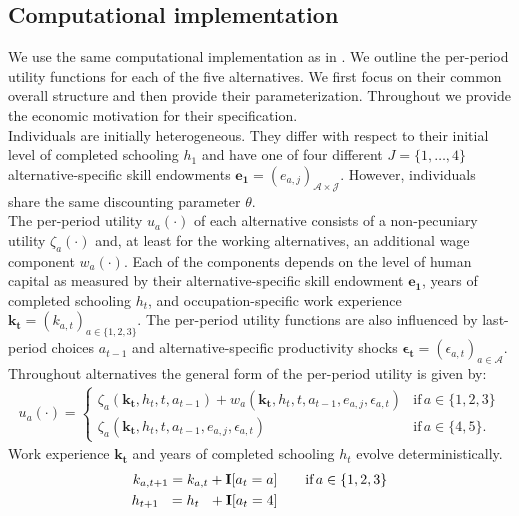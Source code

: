 \subsection{Computational implementation}\label{Computational implementation}
We use the same computational implementation as in \citet{Keane.1997}. We outline the per-period utility functions for each of the five alternatives. We first focus on their common overall structure and then provide their parameterization. Throughout we provide the economic motivation for their specification.\\

\noindent Individuals are initially heterogeneous. They differ with respect to their initial level of completed schooling $h_1$ and have one of four different $J = \{1, \hdots, 4\}$ alternative-specific skill endowments $\bm{e_{1}} = \left(e_{a,j}\right)_{\mathcal{A}\times\mathcal{J}}$. However, individuals share the same discounting parameter $\theta$. \\

\noindent The per-period utility $u_a(\cdot)$ of each alternative consists of a non-pecuniary utility $\zeta_a(\cdot)$ and, at least for the working alternatives, an additional wage component $w_a(\cdot)$. Each of the components depends on the level of human capital as measured by their alternative-specific skill endowment $\bm{e_{1}}$, years of completed schooling $h_t$, and occupation-specific work experience $\bm{k_t} = \left(k_{a,t}\right)_{a\in\{1, 2, 3\}}$. The per-period utility functions are also influenced by last-period choices $a_{t -1}$ and alternative-specific productivity shocks $\bm{\epsilon_t} = \left(\epsilon_{a,t}\right)_{a\in\mathcal{A}}$. Throughout alternatives the general form of the per-period utility is given by:
%
\begin{align*}
u_a(\cdot) =
\begin{cases}
    \zeta_a(\bm{k_t}, h_t, t, a_{t -1})  + w_a(\bm{k_t}, h_t, t, a_{t -1}, e_{a, j}, \epsilon_{a,t})                & \text{if}\, a \in \{1, 2, 3\}  \\
    \zeta_a(\bm{k_t}, h_t, t, a_{t-1}, e_{a,j}, \epsilon_{a,t})                                                  &  \text{if}\, a \in \{4, 5\}.
\end{cases}
\end{align*}
%
Work experience $\bm{k_t}$  and years of completed schooling $h_t$ evolve deterministically.
%
\begin{align*}
k_{a,t+1} = k_{a,t} + {\textbf{I}}[a_t = a]  &\qquad \text{if}\, a \in \{1, 2, 3\} \\
h_{t + 1\phantom{,a}} = h_{t\phantom{,a}} +   {\textbf{I}}[a_t = 4]  &\qquad
\end{align*}
